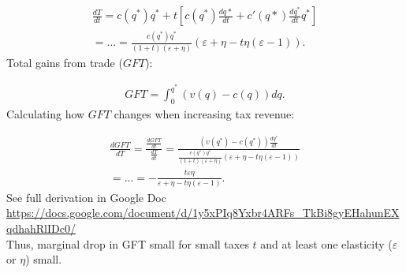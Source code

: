\documentclass[12pt, a4paper, titlepage]{extarticle}
\begin{document}
	\begin{equation}
		\begin{gathered}
			\frac{dT}{dt} = c(q^*)q^* + t\left[c(q^*)\frac{dq*}{dt} + c'(q*)\frac{dq^*}{dt}q^* \right]\\
			= ... = \frac{c(q^*)q^*}{(1 + t)(\varepsilon + \eta)}(\varepsilon + \eta - t\eta(\varepsilon - 1)).
		\end{gathered}
	\end{equation}
	Total gains from trade ($GFT$):
	
	\begin{equation}
		\begin{gathered}
			GFT = \int_0^{q^*}(v(q) - c(q))dq.
		\end{gathered}
	\end{equation}
	Calculating how $GFT$ changes when increasing tax revenue:
	
	\begin{equation}
		\begin{gathered}
			\frac{dGFT}{dT} = \frac{\frac{dGFT}{dt}}{\frac{dT}{dt}} = \frac{(v(q^*) - c(q^*))\frac{dq^*}{dt}}{\frac{c(q^*)q^*}{(1 + t)(\varepsilon + \eta)}(\varepsilon + \eta - t\eta(\varepsilon - 1))}\\
			= ... = -\frac{t\varepsilon\eta}{\varepsilon + \eta - t\eta(\varepsilon - 1)}.
		\end{gathered}
	\end{equation}
	See full derivation in Google Doc\\ \url{https://docs.google.com/document/d/1y5xPIq8Yxbr4ARFs_TkBi8gyEHahunEXqdhahRlIDc0/} \\
	
	Thus, marginal drop in GFT small for small taxes $t$ and at least one elasticity ($\varepsilon$ or $\eta$) small.
	
\end{document}
